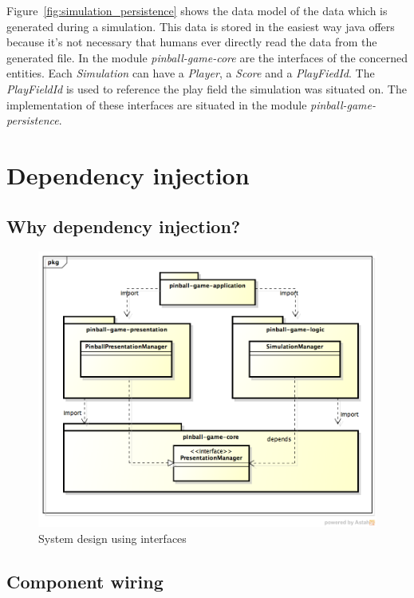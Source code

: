 \documentclass[fontsize=12pt,
               paper=a4,
               twoside=false,
               parskip=half,
               ]{scrartcl}
\begin{document}
Figure~\ref{fig:simulation_persistence} shows the data model of the data which is generated during a simulation. This data is stored in the easiest way java offers because it's not necessary that humans ever directly read the data from the generated file. In the module \emph{pinball-game-core} are the interfaces of the concerned entities. Each \emph{Simulation} can have a \emph{Player}, a \emph{Score} and a \emph{PlayFiedId}. The \emph{PlayFieldId} is used to reference the play field the simulation was situated on. The implementation of these interfaces are situated in the module \emph{pinball-game-persistence}.


\section{Dependency injection}

\subsection{Why dependency injection?}

\begin{figure}[h!]
	\centering
	\includegraphics[width=15.5cm]{./img/dependency-injection1.png}
	\caption[System design]{System design using interfaces}
	\label{fig:dependency_injection1}
\end{figure}

\subsection{Component wiring}
\end{document}
